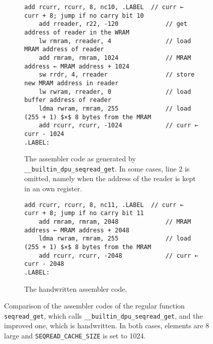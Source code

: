 \begin{figure}[p]
	\begin{subfigure}{\textwidth}
		\begin{lstlisting}[language={[DPU]Assembler}, mathescape, keepspaces]
	add rcurr, rcurr, 8, nc10, .LABEL  // curr ← curr + 8; jump if no carry bit 10
	add rreader, r22, -120             // get address of reader in the WRAM
	lw rmram, rreader, 4               // load MRAM address of reader
	add rmram, rmram, 1024             // MRAM address ← MRAM address + 1024
	sw rrdr, 4, rreader                // store new MRAM address in reader
	lw rwram, rreader, 0               // load buffer address of reader
	ldma rwram, rmram, 255             // load (255 + 1) $×$ 8 bytes from the MRAM
	add rcurr, rcurr, -1024            // curr ← curr - 1024
.LABEL:\end{lstlisting}
		\caption{
			The assembler code as generated by \lstinline|__builtin_dpu_seqread_get|.
			In some cases, line 2 is omitted, namely when the address of the reader is kept in an own register.
		}
	\end{subfigure}

	\begin{subfigure}{\textwidth}
		\begin{lstlisting}[language={[DPU]Assembler}, mathescape, keepspaces]
	add rcurr, rcurr, 8, nc11, .LABEL  // curr ← curr + 8; jump if no carry bit 11
	add rmram, rmram, 2048             // MRAM address ← MRAM address + 2048
	ldma rwram, rmram, 255             // load (255 + 1) $×$ 8 bytes from the MRAM
	add rcurr, rcurr, -2048            // curr ← curr - 2048
.LABEL:\end{lstlisting}
		\caption{
			The handwritten assembler code.
		}
	\end{subfigure}
	\caption{
		Comparison of the assembler codes of the regular function \lstinline|seqread_get|, which calls \lstinline|__builtin_dpu_seqread_get|, and the improved one, which is handwritten.
		In both cases, elements are \qty{8}{\byte} large and \lstinline|SEQREAD_CACHE_SIZE| is set to 1024.
	}
\end{figure}
